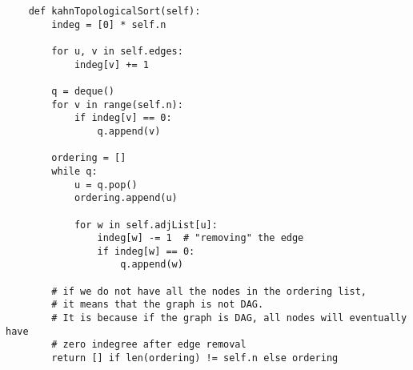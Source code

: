 \begin{verbatim}
    def kahnTopologicalSort(self):
        indeg = [0] * self.n

        for u, v in self.edges:
            indeg[v] += 1

        q = deque()
        for v in range(self.n):
            if indeg[v] == 0:
                q.append(v)

        ordering = []
        while q:
            u = q.pop()
            ordering.append(u)

            for w in self.adjList[u]:
                indeg[w] -= 1  # "removing" the edge
                if indeg[w] == 0:
                    q.append(w)

        # if we do not have all the nodes in the ordering list,
        # it means that the graph is not DAG.
        # It is because if the graph is DAG, all nodes will eventually have
        # zero indegree after edge removal
        return [] if len(ordering) != self.n else ordering
\end{verbatim}
